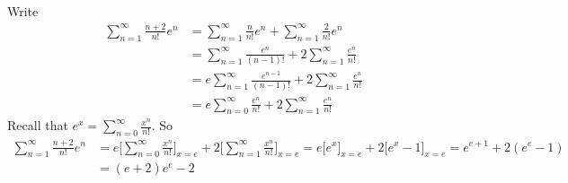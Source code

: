 \begin{solution}
Write
\begin{align*}
\sum_{n=1}^\infty\frac{n+2}{n!}e^n
&=\sum_{n=1}^\infty\frac{n}{n!}e^n
   + \sum_{n=1}^\infty\frac{2}{n!}e^n \\
&=\sum_{n=1}^\infty\frac{e^n}{(n-1)!}
   + 2\sum_{n=1}^\infty\frac{e^n}{n!}\\
&=e\sum_{n=1}^\infty\frac{e^{n-1}}{(n-1)!}
   + 2\sum_{n=1}^\infty\frac{e^n}{n!} \\
&=e\sum_{n=0}^\infty\frac{e^n}{n!}
   + 2\sum_{n=1}^\infty\frac{e^n}{n!}
\end{align*}
Recall that $e^x = \displaystyle\sum\limits_{n=0}^\infty\frac{x^n}{n!}$. So
\begin{align*}
\sum_{n=1}^\infty\frac{n+2}{n!}e^n
&=e\Big[\sum_{n=0}^\infty\frac{x^n}{n!}\Big]_{x=e}
+2\Big[\sum_{n=1}^\infty\frac{x^n}{n!}\Big]_{x=e}
=e\Big[e^x\Big]_{x=e} + 2\Big[e^x-1\Big]_{x=e}
= e^{e+1}  + 2(e^e-1) \\
&=(e+2)e^e-2
\end{align*}

\end{solution}

